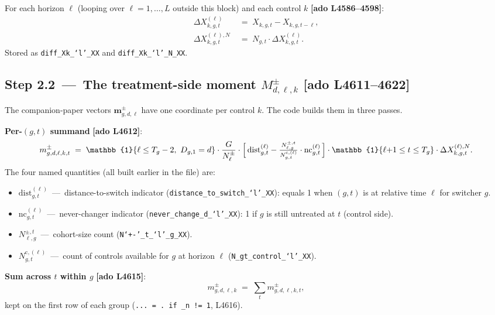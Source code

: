 \documentclass[11pt]{article}
\newcommand{\code}[1]{\texttt{\small #1}}
\newcommand{\Adoref}[1]{\textcolor{accent}{\footnotesize\textbf{[ado L#1]}}}
\newcommand{\1}{\mathbb{1}}
\newcommand{\Ngt}{N_{g,t}}
\begin{document}
For each horizon $\ell$ (looping over $\ell=1,\dots,L$ outside this block) and
each control $k$ \Adoref{4586--4598}:
\begin{align}
\Delta X^{(\ell)}_{k,g,t} \;&=\; X_{k,g,t} - X_{k,g,t-\ell}, \label{eq:longDX}\\
\Delta X^{(\ell),N}_{k,g,t} \;&=\; \Ngt\cdot \Delta X^{(\ell)}_{k,g,t}. \label{eq:longDXN}
\end{align}
Stored as \code{diff\_X{k}\_`l'\_XX} and \code{diff\_X{k}\_`l'\_N\_XX}.

\subsection*{Step 2.2 \,---\, The treatment-side moment $M^{\pm}_{d,\ell,k}$ \Adoref{4611--4622}}

The companion-paper vectors $\bm{m}^{\pm}_{g,d,\ell}$ have one coordinate per
control $k$. The code builds them in three passes.

\medskip
\textbf{Per-$(g,t)$ summand} \Adoref{4612}:
\begin{equation}
m^{\pm}_{g,d,\ell,k,t} \;=\; \1\{\ell\le T_g - 2,\ D_{g,1}=d\}\cdot \frac{G}{N^{\pm}_{\ell}}\cdot
\Bigl[\,\mathrm{dist}^{(\ell)}_{g,t} - \tfrac{N^{\pm,t}_{\ell,g}}{N^{\mathrm{c},(\ell)}_{g,t}}\cdot\mathrm{nc}^{(\ell)}_{g,t}\,\Bigr]\cdot \1\{\ell{+}1\le t\le T_g\}\cdot \Delta X^{(\ell),N}_{k,g,t}.
\label{eq:msummand}
\end{equation}
The four named quantities (all built earlier in the file) are:
\begin{itemize}[leftmargin=*, itemsep=0pt]
\item $\mathrm{dist}^{(\ell)}_{g,t}$ \,---\, distance-to-switch indicator
       (\code{distance\_to\_switch\_`l'\_XX}): equals 1 when $(g,t)$ is at
       relative time $\ell$ for switcher $g$.
\item $\mathrm{nc}^{(\ell)}_{g,t}$ \,---\, never-changer indicator
       (\code{never\_change\_d\_`l'\_XX}): 1 if $g$ is still untreated at $t$
       (control side).
\item $N^{\pm,t}_{\ell,g}$ \,---\, cohort-size count
       (\code{N`+\!-'\_t\_`l'\_g\_XX}).
\item $N^{\mathrm{c},(\ell)}_{g,t}$ \,---\, count of controls available for $g$
       at horizon $\ell$ (\code{N\_gt\_control\_`l'\_XX}).
\end{itemize}

\textbf{Sum across $t$ within $g$} \Adoref{4615}:
\begin{equation}
m^{\pm}_{g,d,\ell,k} \;=\; \sum_{t} m^{\pm}_{g,d,\ell,k,t},
\label{eq:msumt}
\end{equation}
kept on the first row of each group (\code{... = . if \_n != 1}, L4616).
\end{document}
